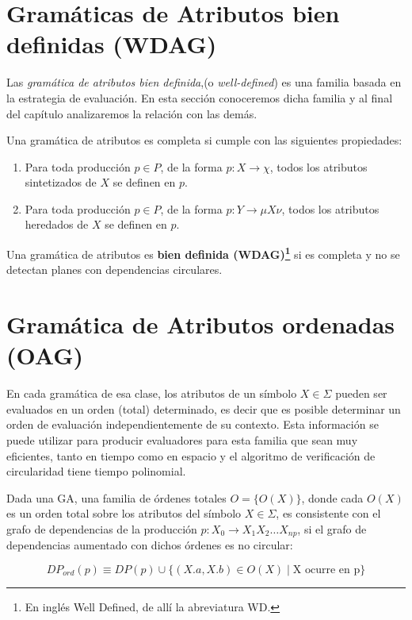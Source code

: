 \section{Gramáticas de Atributos bien definidas (WDAG)}
\label{sec:well-defined}

Las \textit{gramática de atributos bien definida},(o \textit{well-defined}) es una familia basada en la estrategia de evaluación. En esta sección conoceremos dicha familia y al final del capítulo analizaremos la relación con las demás. 

\begin{definition} \label{def:gacompleta}Una gramática de atributos es completa si cumple con las siguientes propiedades:
\begin{enumerate}
\item Para toda producción $p \in P$, de la forma $p:X \rightarrow \chi$, todos los atributos sintetizados de $X$ se definen en $p$.
\item Para toda producción $p \in P$, de la forma $p:Y \rightarrow \mu X \nu$, todos los atributos heredados de $X$ se definen en $p$.
\end{enumerate}
\end{definition}

\begin{definition} 
Una gramática de atributos es \textbf{bien definida (WDAG)\footnote{En inglés Well Defined, de allí la abreviatura WD.}} si es completa y no se detectan planes con dependencias circulares.
\end{definition}

\section{Gramática de Atributos ordenadas (OAG)}
\label{sec:def-oag}
En cada gramática de esa clase, los atributos de un símbolo $X \in \Sigma$ pueden ser evaluados en un orden (total) determinado, es decir que es posible determinar un orden de evaluación independientemente de su contexto.
Esta información se puede utilizar para producir evaluadores para esta familia que sean muy eficientes, tanto en tiempo como en espacio y el algoritmo de verificación de circularidad tiene tiempo polinomial.

\begin{definition} Dada una GA, una familia de órdenes totales $O=\{O(X)\}$, donde cada $ O(X) $ es un orden total sobre los atributos del símbolo $ X \in \Sigma $, es consistente con el grafo de dependencias de la producción $p: X_0 \rightarrow X_1 X_2 \ldots X_{np}$, si el grafo de dependencias aumentado con dichos órdenes es no circular:

$$ DP_{ord}(p) \equiv DP(p) \cup \{ (X.a, X.b) \in O(X) \mid \textrm{X ocurre en p} \} $$
\end{definition}


